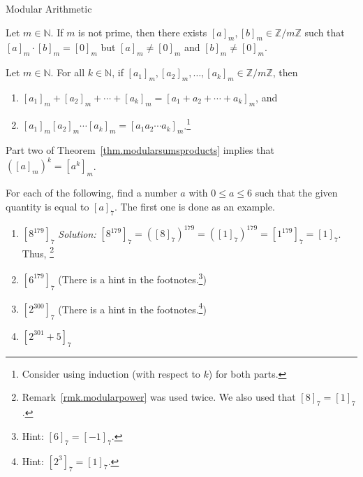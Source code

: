 \begin{section}{Modular Arithmetic}
\begin{theorem}
Let $m\in \mathbb{N}$. If $m$ is not prime, then there exists $[a]_m, [b]_m \in \mathbb{Z}/m\mathbb{Z}$ such that $[a]_m\cdot[b]_m = [0]_m$ but $[a]_m \neq [0]_m$ and $[b]_m \neq [0]_m$.
\end{theorem}

\begin{theorem}\label{thm.modularsumsproducts}
Let $m\in \mathbb{N}$.  For all $k\in \mathbb{N}$, if $[a_1]_m,[a_2]_m,\ldots, [a_k]_m \in \mathbb{Z}/m\mathbb{Z}$, then 
\begin{enumerate}
\item $[a_1]_m+[a_2]_m+\cdots+ [a_k]_m = [a_1 + a_2 +\cdots+ a_k]_m$, and
\item $[a_1]_m [a_2]_m \cdots  [a_k]_m = [a_1 a_2 \cdots a_k]_m$.\footnote{Consider using induction (with respect to $k$) for both parts.} 
\end{enumerate}
\end{theorem}

\begin{remark}\label{rmk.modularpower}
Part two of Theorem~\ref{thm.modularsumsproducts} implies that $([a]_m)^k = [a^k]_m$.
\end{remark}

\begin{exercise}
For each of the following, find a number $a$ with $0\le a \le 6$ such that the given quantity is equal to $[a]_7$. The first one is done as an example.
\begin{enumerate}
\item $[8^{179}]_7$
 \quad\textit{Solution:}  $[8^{179}]_7 = ([8]_7)^{179} =  ([1]_7)^{179} =  [1^{179}]_7 = [1]_7$. Thus,  \footnote{Remark~\ref{rmk.modularpower} was used twice. We also used that  $[8]_7 = [1]_7$.}
\item $[6^{179}]_7$ \quad(There is a hint in the footnotes.\footnote{Hint:  $[6]_7 = [-1]_7$.})
\item $[2^{300}]_7$ \quad(There is a hint in the footnotes.\footnote{Hint:  $[2^3]_7 = [1]_7$.})
\item $[2^{301} +5]_7$
\end{enumerate}
\end{exercise}



\end{section}
